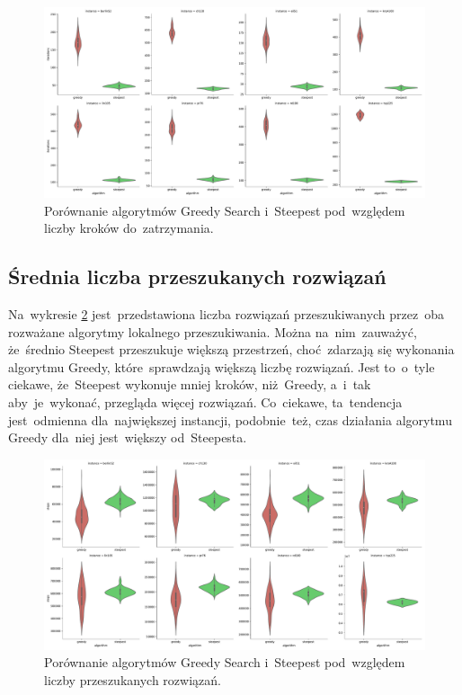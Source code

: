 \begin{figure}
\begin{center}
\includegraphics[width=1.0\textwidth]{graphs/iterations_comparison_violin.pdf}
\end{center}
\caption{Porównanie algorytmów Greedy Search i~Steepest pod~względem liczby kroków do~zatrzymania.}
\label{fig:steps}
\end{figure}

\subsection{Średnia liczba przeszukanych rozwiązań}

Na~wykresie \ref{fig:nsol} jest~przedstawiona liczba rozwiązań przeszukiwanych przez~oba rozważane algorytmy lokalnego przeszukiwania. Można na~nim~zauważyć, że~średnio Steepest przeszukuje większą przestrzeń, choć~zdarzają się wykonania algorytmu Greedy, które~sprawdzają większą liczbę rozwiązań. Jest to~o~tyle ciekawe, że~Steepest wykonuje mniej kroków, niż~Greedy, a~i~tak aby~je~wykonać, przegląda więcej rozwiązań. Co~ciekawe, ta~tendencja jest~odmienna dla~największej instancji, podobnie~też, czas działania algorytmu Greedy dla~niej jest~większy od~Steepesta.

\begin{figure}
\begin{center}
\includegraphics[width=1.0\textwidth]{graphs/steps_comparison_violin.pdf}
\end{center}
\caption{Porównanie algorytmów Greedy Search i~Steepest pod~względem liczby przeszukanych rozwiązań.}
\label{fig:nsol}
\end{figure}

